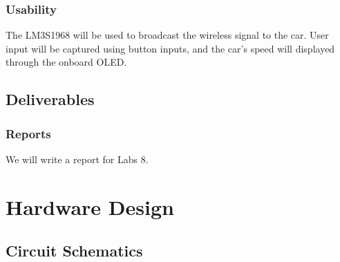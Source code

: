 \documentclass[twoside]{article}
\begin{document}
\subsubsection{Usability}
The LM3S1968 will be used to broadcast the wireless signal to the car. User input will be captured using button inputs, and the car's speed will displayed through the onboard OLED.
\subsection{Deliverables}
\subsubsection{Reports}
We will write a report for Labs 8.


\section{Hardware Design}
\subsection{Circuit Schematics}
\end{document}
